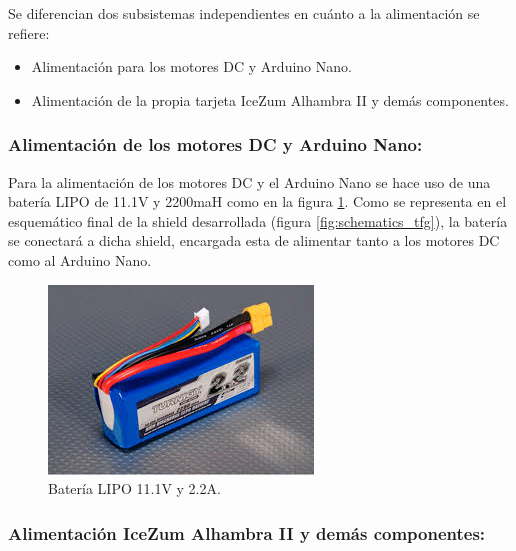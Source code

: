 Se diferencian dos subsistemas independientes en cuánto a la alimentación se refiere:
\begin{itemize}
	\item Alimentación para los motores DC y Arduino Nano.
	\item Alimentación de la propia tarjeta IceZum Alhambra II y demás componentes.
\end{itemize}

\subsubsection{Alimentación de los motores DC y Arduino Nano:}
Para la alimentación de \cite{Wyer2017} los motores DC y el Arduino Nano se hace uso de una batería LIPO de 11.1V y 2200maH como en la figura \ref{fig:lipo111}. Como se representa en el esquemático final de la shield desarrollada (figura \ref{fig:schematics_tfg}), la batería se conectará a dicha shield, encargada esta de alimentar tanto a los motores DC como al Arduino Nano.

\begin{center}
	\begin{figure}[H]
		\center
		\includegraphics[scale=0.8]{imagenes/Balancing_Robot/LIPO111}
		\caption{Batería LIPO 11.1V y 2.2A. }
		\label{fig:lipo111}
	\end{figure}
\end{center}

\subsubsection{Alimentación IceZum Alhambra II y demás componentes:}

